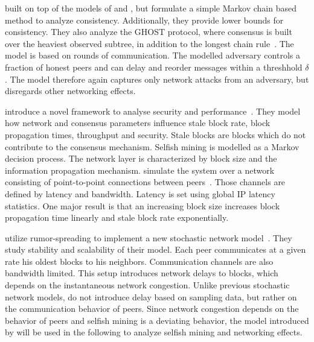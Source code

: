 \citeauthor{kiffer2018better} built on top of the models of \citeauthor{garay2015bitcoin} and \citeauthor{pass2017analysis}, but formulate a simple Markov chain based method to analyze consistency. Additionally, they provide lower bounds for consistency. They also analyze the GHOST protocol, where consensus is built over the heaviest observed subtree, in addition to the longest chain rule~\cite{kiffer2018better}. The model is based on rounds of communication. The modelled adversary controls a fraction of honest peers and  can delay and reorder messages within a threshhold $\delta$. The model therefore again captures only network attacks from an adversary, but disregards other networking effects.

\citeauthor{gervais2016security} introduce a novel framework to analyse security and performance~\cite{gervais2016security}. They model how network and consensus parameters influence stale block rate, block propagation times, throughput and security. Stale blocks are blocks which do not contribute to the consensus mechanism. Selfish mining is modelled as a Markov decision process. The network layer is characterized by block size and the information propagation mechanism. \citeauthor{gervais2016security} simulate the system over a network consisting of point-to-point connections between peers~\cite{gervais2016security}. Those channels are defined by latency and bandwidth. Latency is set using global IP latency statistics. One major result is that an increasing block size increases block propagation time linearly and stale block rate exponentially. 

\citeauthor{gopalan} utilize rumor-spreading to implement a new stochastic network model~\cite{gopalan}. They study stability and scalability of their model. Each peer communicates at a given rate his oldest blocks to his neighbors. Communication channels are also bandwidth limited. This setup introduces network delays to blocks, which depends on the instantaneous network congestion.
Unlike previous stochastic network models, \citeauthor{gopalan} do not introduce delay based on sampling data, but rather on the communication behavior of peers. Since network congestion depends on the behavior of peers and selfish mining is a deviating behavior, the model introduced by \citeauthor{gopalan} will be used in the following to analyze selfish mining and networking effects.

